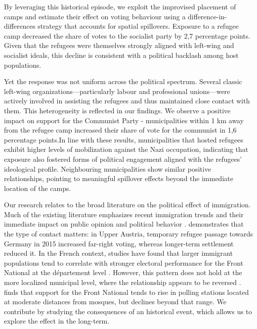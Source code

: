 By leveraging this historical episode, we exploit the improvised placement of camps and estimate their effect on voting behaviour using a difference-in-differences strategy that accounts for spatial spillovers. Exposure to a refugee camp decreased the share of votes to the socialist party by 2,7 percentage points. Given that the refugees were themselves strongly aligned with left-wing and socialist ideals, this decline is consistent with a political backlash among host populations.

Yet the response was not uniform across the political spectrum. Several classic left-wing organizations—particularly labour and professional unions—were actively involved in assisting the refugees and thus maintained close contact with them. This heterogeneity is reflected in our findings. We observe a positive impact on support for the Communist Party - municipalities within 1 km away from the refugee camp increased their share of vote for the communist in 1,6 percentage points.In line with these results, municipalities that hosted refugees exhibit higher levels of mobilization against the Nazi occupation, indicating that exposure also fostered forms of political engagement aligned with the refugees’ ideological profile. Neighbouring municipalities show similar positive relationships, pointing to meaningful spillover effects beyond the immediate location of the camps.  


Our research relates to the broad literature on the political effect of immigration. Much of the existing literature emphasizes recent immigration trends and their immediate impact on public opinion and political behavior \citep{halla_immigration_2017, dustmann_refugee_2018, steinhardt_xenophobic_2018}. \citet{steinmayr_contact_2021} demonstrates that the type of contact matters: in Upper Austria, temporary refugee passage towards Germany in 2015 increased far-right voting, whereas longer-term settlement reduced it. In the French context, studies have found that larger immigrant populations tend to correlate with stronger electoral performance for the Front National at the département level \citep{edo_immigration_2019}. However, this pattern does not hold at the more localized municipal level, where the relationship appears to be reversed \citep{della2013competitive, vasilopoulos2022residential, vertier_dismantling_2023}. \citet{dazey_mosque_2024} finds that support for the Front National tends to rise in polling stations located at moderate distances from mosques, but declines beyond that range. We contribute by studying the consequences of an historical event, which allows us to explore the effect in the long-term.

